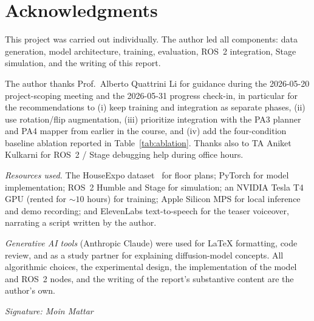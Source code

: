 \documentclass[conference]{IEEEtran}
\begin{document}
\section*{Acknowledgments}

This project was carried out individually. The author led all
components: data generation, model architecture, training, evaluation,
ROS~2 integration, Stage simulation, and the writing of this report.

The author thanks Prof.\ Alberto Quattrini Li for guidance during the
2026-05-20 project-scoping meeting and the 2026-05-31 progress
check-in, in particular for the recommendations to
(i) keep training and integration as separate phases, (ii) use
rotation/flip augmentation, (iii) prioritize integration with the
PA3 planner and PA4 mapper from earlier in the course, and (iv) add
the four-condition baseline ablation reported in
Table~\ref{tab:ablation}. Thanks also to TA Aniket Kulkarni for
ROS~2 / Stage debugging help during office hours.

\emph{Resources used.} The HouseExpo dataset~\cite{li2020houseexpo}
for floor plans; PyTorch for model implementation; ROS~2 Humble and
Stage for simulation; an NVIDIA Tesla T4 GPU (rented for $\sim 10$
hours) for training; Apple Silicon MPS for local inference and demo
recording; and ElevenLabs text-to-speech for the teaser voiceover,
narrating a script written by the author.

\emph{Generative AI tools} (Anthropic Claude) were used for
\LaTeX{} formatting, code review, and as a study partner for
explaining diffusion-model concepts. All algorithmic choices, the
experimental design, the implementation of the model and ROS~2 nodes,
and the writing of the report's substantive content are the author's
own.

\medskip
\noindent\emph{Signature: Moin Mattar}
\end{document}
